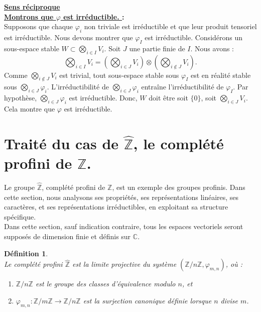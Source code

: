\documentclass[a4paper, 14pt]{report}
\newtheorem{definition}{Définition}[section]
\begin{document}
\begin{onehalfspace}
{\begin{enumerate} [label=\roman*)]
		\textbf{\underline{	Sens réciproque}}\\
\textbf{\underline{Montrons que \( \varphi \) est irréductible. } :}\\	
Supposons que chaque \( \varphi_i \) non triviale est irréductible et que leur produit tensoriel est irréductible.  
Nous devons montrer que \( \varphi_I \) est irréductible.
Considérons un sous-espace stable \( W \subset \bigotimes_{i \in I} V_i \). Soit $J$ une partie finie de $I$.
	Nous avons :
	\[
	\bigotimes_{i \in I} V_i = \left( \bigotimes_{i \in J} V_i \right) \otimes \left( \bigotimes_{i \notin J} V_i \right).
	\]
Comme \( \bigotimes_{i \notin J} V_i \) est trivial, tout sous-espace stable sous \( \varphi_I \) est en réalité stable sous \( \bigotimes_{i \in J} \varphi_i \).  
L'irréductibilité de \( \bigotimes_{i \in J} \varphi_i \) entraîne l'irréductibilité de \( \varphi_I \). Par hypothèse, \( \bigotimes_{i \in J} \varphi_i \) est irréductible. Donc, \( W \) doit être soit \( \{0\} \), soit \( \bigotimes_{i \in J} V_i \).  
Cela montre que \( \varphi \) est irréductible.
\end{enumerate}



\section{Traité du cas de $\widehat{\mathbb{Z}}$, le complété profini de $\mathbb{Z}$.}
Le groupe \( \widehat{\mathbb{Z}} \), complété profini de \( \mathbb{Z} \), est un exemple des groupes profinis. Dans cette section, nous analysons ses propriétés, ses représentations linéaires, ses caractères, et ses représentations irréductibles, en exploitant sa structure spécifique.\\

Dans cette section, sauf indication contraire, tous les espaces vectoriels seront supposés de dimension finie et définis sur \( \mathbb{C} \).

\begin{definition} \cite{ribes-zalesskii}\\
Le complété profini $\widehat{\mathbb{Z}}$ est la limite projective du système $(\mathbb{Z}/n\mathbb{Z}, \varphi_{m,n})$, où :
	\begin{enumerate} [label=\roman*)]
	\item $\mathbb{Z}/n\mathbb{Z}$  est le groupe des classes d’équivalence modulo $n$, et
	\item $\varphi_{m,n} : \mathbb{Z}/m\mathbb{Z} \to \mathbb{Z}/n\mathbb{Z}$ est la surjection canonique définie lorsque $n$ divise $m$.
	\end{enumerate}
\end{definition}

}
\end{onehalfspace}
\end{document}
